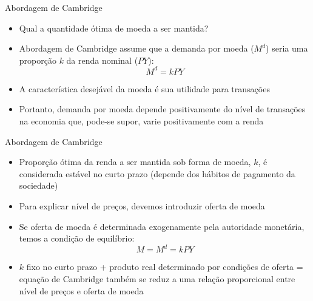 \documentclass[10pt]{beamer}
\begin{document}
\begin{frame}
    {Abordagem de Cambridge}
    \begin{itemize}
        \item Qual a quantidade ótima de moeda a ser mantida?\bigskip
        \item Abordagem de Cambridge assume que a demanda por moeda ($M^d$) seria uma proporção $k$ da renda nominal ($PY$):
        \begin{equation}
            M^d = kPY
            \label{aula3_eq7}
        \end{equation}
        \item A característica desejável da moeda é sua utilidade para transações\bigskip
        \item Portanto, demanda por moeda depende positivamente do nível de transações na economia que, pode-se supor, varie positivamente com a renda
    \end{itemize}
\end{frame}

\begin{frame}
    {Abordagem de Cambridge}
    \begin{itemize}
        \item Proporção ótima da renda a ser mantida sob forma de moeda, $k$, é considerada estável no curto prazo (depende dos hábitos de pagamento da sociedade)\bigskip
        \item Para explicar nível de preços, devemos introduzir oferta de moeda\bigskip
        \item Se oferta de moeda é determinada exogenamente pela autoridade monetária, temos a condição de equilíbrio:
        \begin{equation}
            M = M^d = kPY
            \label{aula3_eq8}
        \end{equation}
        \item $k$ fixo no curto prazo + produto real determinado por condições de oferta = equação de Cambridge também se reduz a uma relação proporcional entre nível de preços e oferta de moeda
    \end{itemize}
\end{frame}
\end{document}
